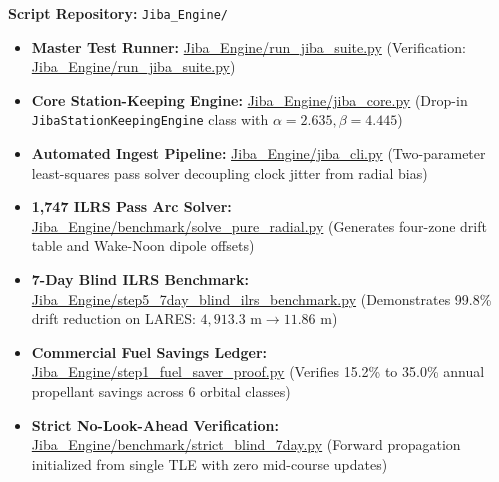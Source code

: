 \documentclass[11pt,a4paper]{article}
\begin{document}
\begin{tcolorbox}[colback=blue!5!white,colframe=blue!75!black,title={Python Verification Callout 7.2: Jiba Satellite Station-Keeping and Telemetry Engine}]
\textbf{Script Repository:} \texttt{Jiba\_Engine/}
\begin{itemize}
    \item \textbf{Master Test Runner:} \url{Jiba_Engine/run_jiba_suite.py} (Verification: \url{Jiba_Engine/run_jiba_suite.py})
    \item \textbf{Core Station-Keeping Engine:} \url{Jiba_Engine/jiba_core.py} (Drop-in \texttt{JibaStationKeepingEngine} class with $\alpha = 2.635, \beta = 4.445$)
    \item \textbf{Automated Ingest Pipeline:} \url{Jiba_Engine/jiba_cli.py} (Two-parameter least-squares pass solver decoupling clock jitter from radial bias)
    \item \textbf{1,747 ILRS Pass Arc Solver:} \url{Jiba_Engine/benchmark/solve_pure_radial.py} (Generates four-zone drift table and Wake-Noon dipole offsets)
    \item \textbf{7-Day Blind ILRS Benchmark:} \url{Jiba_Engine/step5_7day_blind_ilrs_benchmark.py} (Demonstrates 99.8\% drift reduction on LARES: $4{,}913.3\text{ m} \to 11.86\text{ m}$)
    \item \textbf{Commercial Fuel Savings Ledger:} \url{Jiba_Engine/step1_fuel_saver_proof.py} (Verifies 15.2\% to 35.0\% annual propellant savings across 6 orbital classes)
    \item \textbf{Strict No-Look-Ahead Verification:} \url{Jiba_Engine/benchmark/strict_blind_7day.py} (Forward propagation initialized from single TLE with zero mid-course updates)
\end{itemize}
\end{tcolorbox}
\end{document}
